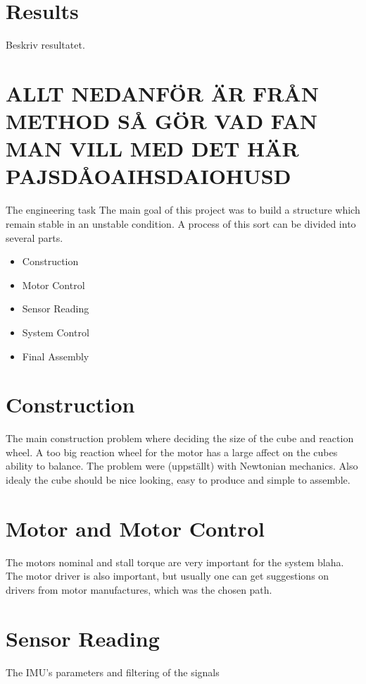 \documentclass[a4paper,11pt]{kth-mag}
\begin{document}
\section{Results}
Beskriv resultatet.

\section{ALLT NEDANFÖR ÄR FRÅN METHOD SÅ GÖR VAD FAN MAN VILL MED DET HÄR PAJSDÅOAIHSDAIOHUSD}


The engineering task The main goal of this project was to build a structure which remain stable in an unstable condition. A process of this sort can be divided into several parts. 
\begin{itemize}
\item Construction
\item Motor Control
\item Sensor Reading
\item System Control
\item Final Assembly
\end{itemize}

\section{Construction}
The main construction problem where deciding the size of the cube and reaction wheel. A too big reaction wheel for the motor has a large affect on the cubes ability to balance. The problem were (uppställt) with Newtonian mechanics.
Also idealy the cube should be nice looking, easy to produce and simple to assemble. 
 
\section{Motor and Motor Control}
The motors nominal and stall torque are very important for the system blaha. The motor driver is also important, but usually one can get suggestions on drivers from motor manufactures, which was the chosen path.
  
\section{Sensor Reading}
The IMU's parameters and filtering of the signals
\end{document}
